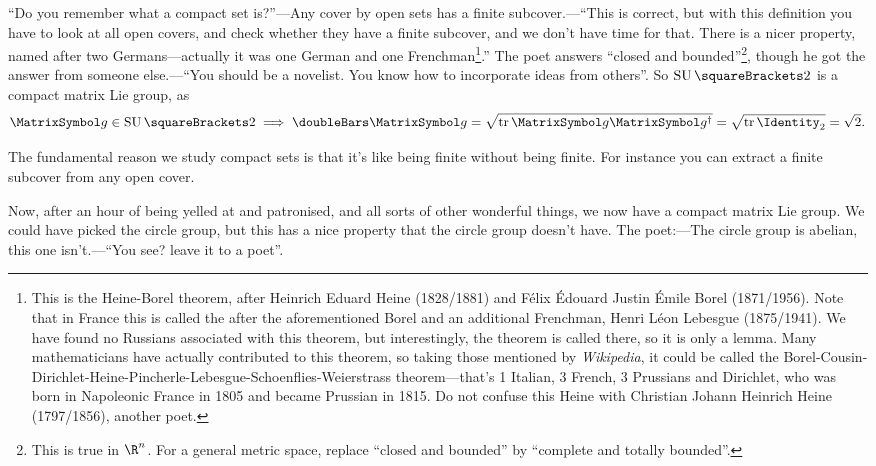 \documentclass[10pt, a4paper, twoside]{lecturenotes}
\newcommand{\Rn}{{\R^n}}
\begin{document}
``Do you remember what a compact set is?''---Any cover by open sets has a finite subcover.---``This is correct, but with this definition you have to look at all open covers, and check whether they have a finite subcover, and we don't have time for that. There is a nicer property, named after two Germans---actually it was one German and one Frenchman\footnote{This is the Heine-Borel theorem, after Heinrich Eduard Heine (1828/1881) and Félix Édouard Justin Émile Borel (1871/1956). Note that in France this is called the  after the aforementioned Borel and an additional Frenchman, Henri Léon Lebesgue (1875/1941). We have found no Russians associated with this theorem, but interestingly, the theorem is called  there, so it is only a lemma. Many mathematicians have actually contributed to this theorem, so taking those mentioned by \emph{Wikipedia}, it could be called the Borel-Cousin-Dirichlet-Heine-Pincherle-Lebesgue-Schoenflies-Weierstrass theorem---that's 1 Italian, 3 French, 3 Prussians and Dirichlet, who was born in Napoleonic France in 1805 and became  Prussian in 1815. Do not confuse this Heine with Christian Johann Heinrich Heine (1797/1856), another poet.}.'' The poet answers ``closed and bounded''\footnote{This is true in $\Rn$. For a general metric space, replace ``closed and bounded'' by ``complete and totally bounded''.}, though he got the answer from someone else.---``You should be a novelist. You know how to incorporate ideas from others''. So $\SpecialUnitaryGroup\of{2}$ is a compact matrix Lie group, as \[
\matg\in\SpecialUnitaryGroup\of 2 \Implies \FrobeniusNorm\matg = \sqrt{\Trace \matg\adj\matg} = \sqrt{\Trace \Identity_2} = \sqrt{2}\text.
\]

The fundamental reason we study compact sets is that it's like being finite without being finite. For instance you can extract a finite subcover from any open cover.

Now, after an hour of being yelled at and patronised, and all sorts of other wonderful things,  we now have a compact matrix Lie group. We could have picked the circle group, but this has a nice property that the circle group doesn't have. The poet:---The circle group is abelian, this one isn't.---``You see? leave it to a poet''.
\end{document}

